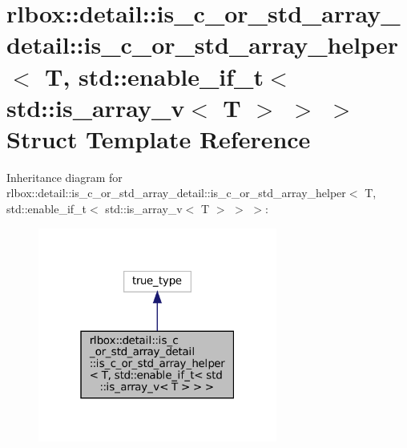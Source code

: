 \hypertarget{structrlbox_1_1detail_1_1is__c__or__std__array__detail_1_1is__c__or__std__array__helper_3_01T_00e23e81f699b5338ffda7a4814dc1a20e}{}\section{rlbox\+:\+:detail\+:\+:is\+\_\+c\+\_\+or\+\_\+std\+\_\+array\+\_\+detail\+:\+:is\+\_\+c\+\_\+or\+\_\+std\+\_\+array\+\_\+helper$<$ T, std\+:\+:enable\+\_\+if\+\_\+t$<$ std\+:\+:is\+\_\+array\+\_\+v$<$ T $>$ $>$ $>$ Struct Template Reference}
\label{structrlbox_1_1detail_1_1is__c__or__std__array__detail_1_1is__c__or__std__array__helper_3_01T_00e23e81f699b5338ffda7a4814dc1a20e}


Inheritance diagram for rlbox\+:\+:detail\+:\+:is\+\_\+c\+\_\+or\+\_\+std\+\_\+array\+\_\+detail\+:\+:is\+\_\+c\+\_\+or\+\_\+std\+\_\+array\+\_\+helper$<$ T, std\+:\+:enable\+\_\+if\+\_\+t$<$ std\+:\+:is\+\_\+array\+\_\+v$<$ T $>$ $>$ $>$\+:\nopagebreak
\begin{figure}[H]
\begin{center}
\leavevmode
\includegraphics[width=223pt]{structrlbox_1_1detail_1_1is__c__or__std__array__detail_1_1is__c__or__std__array__helper_3_01T_005cef22c49da01f4aae103214978b4e9e}
\end{center}
\end{figure}


